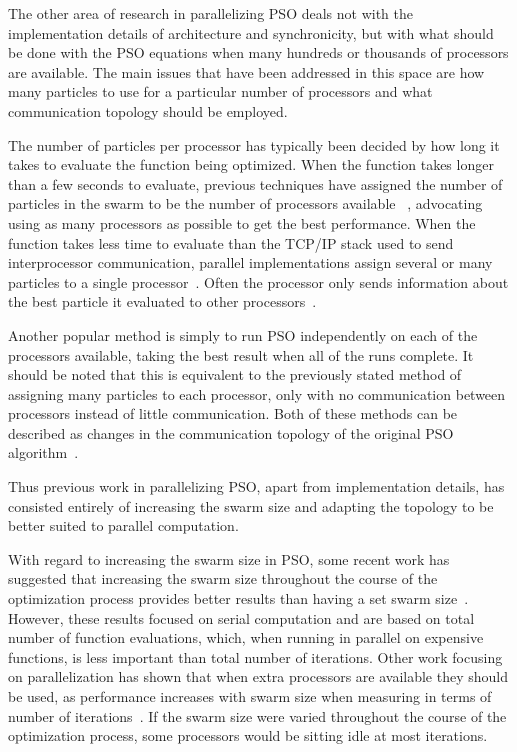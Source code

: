 \documentclass[ms]{byuprop}
\begin{document}
The other area of research in parallelizing PSO deals not with the
implementation details of architecture and synchronicity, but with what should
be done with the PSO equations when many hundreds or thousands of processors
are available.  The main issues that have been addressed in this space are how
many particles to use for a particular number of processors and what
communication topology should be employed.

The number of particles per processor has typically been decided by how long it
takes to evaluate the function being optimized.  When the function takes longer
than a few seconds to evaluate, previous techniques have assigned the number of
particles in the swarm to be the number of processors available~%
\citep{jin-2005-pso-antenna-designs,mcnabb-2009-large-particle-swarms},
advocating using as many processors as possible to get the best performance.
When the function takes less time to evaluate than the TCP/IP stack used to
send interprocessor communication, parallel implementations assign several or
many particles to a single processor~\citep{chu-2006-intelligent-parallel-pso,
chang-2005-parallel-pso-with-communication-strategies}.  Often the processor
only sends information about the best particle it evaluated to other
processors~\citep{belal-2004-parallel-models-for-pso}.

Another popular method is simply to run PSO independently on each of the
processors available, taking the best result when all of the runs complete.  It
should be noted that this is equivalent to the previously stated method of
assigning many particles to each processor, only with no communication between
processors instead of little communication.  Both of these methods can be
described as changes in the communication topology of the original PSO
algorithm~\citep{mcnabb-2009-large-particle-swarms}.

Thus previous work in parallelizing PSO, apart from implementation details, has
consisted entirely of increasing the swarm size and adapting the topology to be
better suited to parallel computation.

With regard to increasing the swarm size in PSO, some recent work has suggested
that increasing the swarm size throughout the course of the optimization
process provides better results than having a set swarm
size~\citep{hsieh-2009-efficient-population-utilization-for-pso,
montes-de-oca-2010-incremental-social-learning-pso}.  However, these results
focused on serial computation and are based on total number of function
evaluations, which, when running in parallel on expensive functions, is less
important than total number of iterations.  Other work focusing on
parallelization has shown that when extra processors are available they should
be used, as performance increases with swarm size when measuring in terms of
number of iterations~\citep{mcnabb-2009-large-particle-swarms,
jin-2005-pso-antenna-designs}.  If the swarm size were varied throughout the
course of the optimization process, some processors would be sitting idle at
most iterations.
\end{document}
